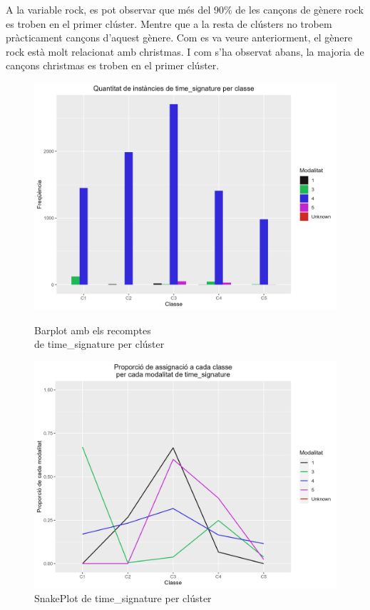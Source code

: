 \documentclass{article}
\begin{document}
A la variable rock, es pot observar que més del 90\% de les cançons de gènere rock es troben en el primer clúster. Mentre que a la resta de clústers no trobem pràcticament cançons d'aquest gènere. Com es va veure anteriorment, el gènere rock està molt relacionat amb christmas. I com s'ha observat abans, la majoria de cançons christmas es troben en el primer clúster.

\begin{figure}[H]
\centering
    \begin{minipage}{.49\textwidth}
        \centering
        \includegraphics[width=0.95\linewidth]{Images/5_Profiling/categoriques/cat/Cat_BarPlot_time_signature.png}
        \caption{Barplot amb els recomptes \\ de time\_signature per clúster}
        \label{fig:Cat_BarPlot_time_signature}
    \end{minipage}%
    \begin{minipage}{.49\textwidth}
        \centering
        \includegraphics[width=0.95\linewidth]{Images/5_Profiling/categoriques/cat/Cat_SnakePlot_time_signature.png}
        \caption{SnakePlot de time\_signature per clúster}
        \label{fig:Cat_SnakePlot_time_signature}
    \end{minipage}%
\end{figure}
\end{document}
